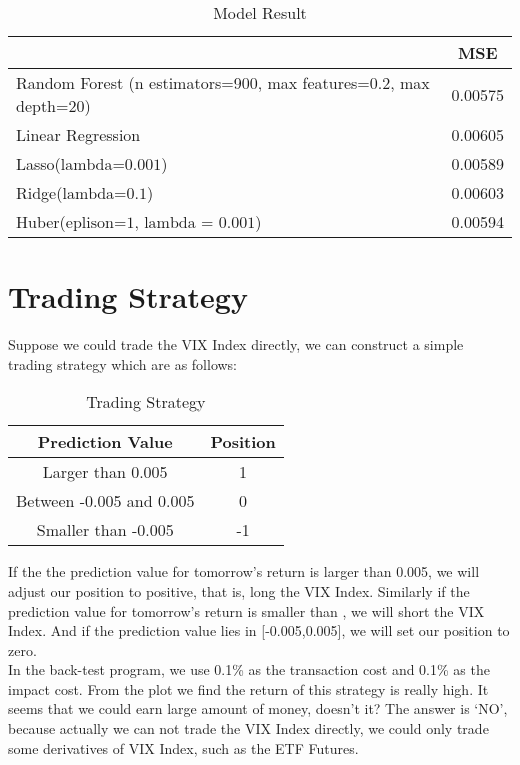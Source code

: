 \documentclass[fleqn,10pt]{SelfArx} %
\begin{document}
\begin{table}[h]
  \centering
\caption{Model Result}
\begin{tabular}{ |p{6cm}|c| }
      \hline
        & MSE\\
      \hline
      Random Forest (n estimators=900, max features=0.2, max depth=20) & 0.00575 \\
      \hline
      Linear Regression & 0.00605 \\
      \hline
      Lasso($\text{lambda=0.001}$) & 0.00589 \\
      \hline
      Ridge($\text{lambda=0.1}$) & 0.00603 \\
      \hline
      Huber($\text{eplison=1, lambda = 0.001}$) & 0.00594 \\
      \hline
  \end{tabular}
  \label{tab:2}
\end{table}

\section{Trading Strategy}
Suppose we could trade the VIX Index directly, we can construct a simple trading strategy which are as follows:

\begin{table}[th]
  \centering
  \caption{Trading Strategy}
\begin{tabular}{ |c|c| }
      \hline
        Prediction Value & Position\\
      \hline
      Larger than 0.005 & 1 \\
      \hline
      Between -0.005 and 0.005  & 0 \\
      \hline
      Smaller than -0.005  & -1 \\
      \hline
  \end{tabular}
  \label{tab:2}
\end{table}

\noindent
If the the prediction value for tomorrow’s return is larger than 0.005, we will adjust our position to positive, that is, long the VIX Index. Similarly if the prediction value for tomorrow’s return is smaller than , we will short the VIX Index. And if the prediction value lies in [-0.005,0.005], we will set our position to zero.\\

\noindent
In the back-test program, we use 0.1\% as the transaction cost and 0.1\% as the impact cost. From the plot we find the return of this strategy is really high. It seems that we could earn large amount of money, doesn’t it? The answer is ‘NO’, because actually we can not trade the VIX Index directly, we could only trade some derivatives of VIX Index, such as the ETF Futures.
\end{document}
